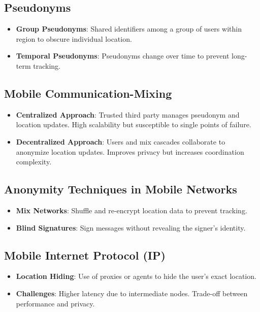 \documentclass{article}
\begin{document}
\subsection{Pseudonyms}
\begin{itemize}
  \item \textbf{Group Pseudonyms}: Shared identifiers among a group of users within region to obscure individual location.
  \item \textbf{Temporal Pseudonyms}: Pseudonyms change over time to prevent long-term tracking.
\end{itemize}

\subsection{Mobile Communication-Mixing}
\begin{itemize}
  \item \textbf{Centralized Approach}: Trusted third party manages pseudonym and location updates. High scalability but susceptible to single points of failure.
  \item \textbf{Decentralized Approach}: Users and mix cascades collaborate to anonymize location updates. Improves privacy but increases coordination complexity.
\end{itemize}

\subsection{Anonymity Techniques in Mobile Networks}
\begin{itemize}
  \item \textbf{Mix Networks}: Shuffle and re-encrypt location data to prevent tracking.
  \item \textbf{Blind Signatures}: Sign messages without revealing the signer's identity.
\end{itemize}

\subsection{Mobile Internet Protocol (IP)}
\begin{itemize}
  \item \textbf{Location Hiding}: Use of proxies or agents to hide the user's exact location.
  \item \textbf{Challenges}: Higher latency due to intermediate nodes. Trade-off between performance and privacy.
\end{itemize}
\end{document}
